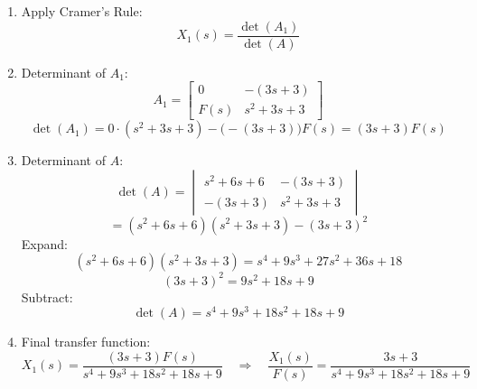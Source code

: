 \documentclass[11pt]{article}
\begin{document}
\begin{enumerate}[label=(\alph*), itemindent=*, leftmargin=*, nolistsep]
    \item Apply Cramer's Rule:
    \[
    X_1(s) = \frac{\det(A_1)}{\det(A)}
    \]

    \item Determinant of $A_1$:
    \[
    A_1 =
    \begin{bmatrix}
    0 & -(3s+3) \\
    F(s) & s^2+3s+3
    \end{bmatrix}
    \]
    \[
    \det(A_1) = 0\cdot(s^2+3s+3) - \big(-(3s+3)\big)F(s) = (3s+3)F(s)
    \]

    \item Determinant of $A$:
    \[
    \det(A) =
    \begin{vmatrix}
    s^2+6s+6 & -(3s+3) \\
    -(3s+3) & s^2+3s+3
    \end{vmatrix}
    \]
    \[
    = (s^2+6s+6)(s^2+3s+3) - (3s+3)^2
    \]
    Expand:
    \[
    (s^2+6s+6)(s^2+3s+3) = s^4 + 9s^3 + 27s^2 + 36s + 18
    \]
    \[
    (3s+3)^2 = 9s^2 + 18s + 9
    \]
    Subtract:
    \[
    \det(A) = s^4 + 9s^3 + 18s^2 + 18s + 9
    \]

    \item Final transfer function:
    \[
    X_1(s) = \frac{(3s+3)F(s)}{s^4+9s^3+18s^2+18s+9}
    \quad\Rightarrow\quad
    \boxed{\frac{X_1(s)}{F(s)} = \frac{3s+3}{s^4+9s^3+18s^2+18s+9}}
    \]
    
\end{enumerate}

\end{document}
